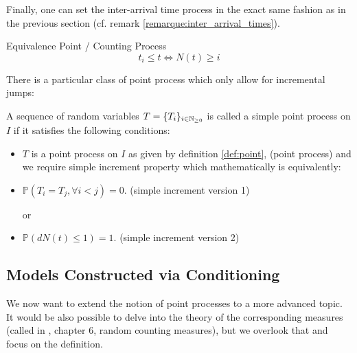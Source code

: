 \documentclass[11pt]{book}
\newcommand{\sequence}[1]{\{ #1 \}_{ i \in \N} }
\begin{document}
Finally, one can set the inter-arrival time process in the exact same fashion as in the previous section (cf. remark \ref{remarque:inter_arrival_times}).

\begin{theoreme}[label = thrm:point_counting]{Equivalence Point / Counting Process}
\begin{equation}
t_i \leq t  \iff N(t) \geq i 
\end{equation}
\end{theoreme}


There is a particular class of point process which only allow for incremental jumps:
\begin{definition}
A sequence of random variables $T = \sequence{T_i}$ is called a simple point process on $I$ if it satisfies the following conditions:
\begin{itemize}
\setlength{\itemindent}{3 cm}
\item $T$ is a point process on $I$ as given by definition \ref{def:point}, (point process)
and we require simple increment property which mathematically is equivalently:
\item $\mathbb P ( T_i = T_j, \forall i < j) = 0$. (simple increment version 1)

or

\item $\mathbb P ( dN(t) \leq 1) = 1$. (simple increment version 2)
\end{itemize}
\end{definition}


\subsection{Models Constructed via Conditioning}
We now want to extend the notion of point processes to a more advanced topic. It would be also possible to delve into the theory of the corresponding measures (called in \cite{daley}, chapter 6, random counting measures), but we overlook that and focus on the definition.
\end{document}
